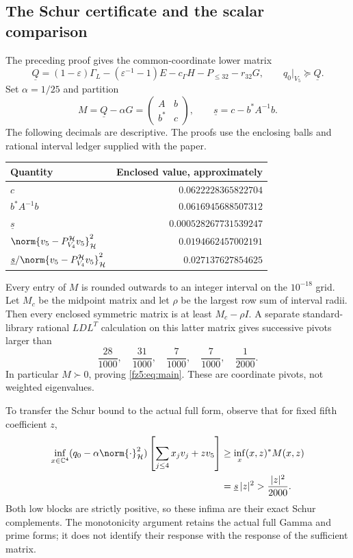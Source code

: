 \documentclass[11pt,a4paper]{article}
\numberwithin{equation}{section}
\theoremstyle{definition}\newtheorem{definition}[theorem]{Definition}
\theoremstyle{remark}\newtheorem{remark}[theorem]{Remark}
\newcommand{\Hh}{\mathcal H}\newcommand{\Hw}{\mathcal H}
\begin{document}
\subsection{The Schur certificate and the scalar comparison}
The preceding proof gives the common-coordinate lower matrix
\begin{equation}\label{fz5:eq:Qlower}
 \underline Q=(1-\varepsilon)\Gamma_L-(\varepsilon^{-1}-1)E
                -c_\Gamma H-P_{\le32}-r_{32}G,
 \qquad q_0|_{V_5}\succeq\underline Q.
\end{equation}
Set $\alpha=1/25$ and partition
\[
 M=\underline Q-\alpha G=\begin{pmatrix}A&b\\b^*&c\end{pmatrix},
 \qquad \underline s=c-b^*A^{-1}b.
\]
The following decimals are descriptive. The proofs use the enclosing
balls and rational interval ledger supplied with the paper.
\begin{center}
\begin{tabular}{lr}\toprule
Quantity & Enclosed value, approximately\\\midrule
$c$ & $0.0622228365822704$\\
$b^*A^{-1}b$ & $0.0616945688507312$\\
$\underline s$ & $0.000528267731539247$\\
$\norm{v_5-P_{V_4}^{\Hh}v_5}_\Hh^2$ & $0.0194662457002191$\\
$\underline s/\norm{v_5-P_{V_4}^{\Hh}v_5}_\Hh^2$ & $0.027137627854625$\\
\bottomrule\end{tabular}
\end{center}

Every entry of $M$ is rounded outwards to an integer interval on the
$10^{-18}$ grid. Let $M_c$ be the midpoint matrix and let $\rho$ be the
largest row sum of interval radii. Then every enclosed symmetric matrix
is at least $M_c-\rho I$. A separate standard-library rational
$LDL^T$ calculation on this latter matrix gives successive pivots larger
than
\[
 \frac{28}{1000},\quad\frac{31}{1000},\quad\frac7{1000},
 \quad\frac7{1000},\quad\frac1{2000}.
\]
In particular $M\succ0$, proving \eqref{fz5:eq:main}. These are coordinate
pivots, not weighted eigenvalues.

To transfer the Schur bound to the actual full form, observe that for
fixed fifth coefficient $z$,
\begin{align*}
 \inf_{x\in\mathbb C^4}(q_0-\alpha\norm{\cdot}_\Hh^2)
          \left[\sum_{j\le4}x_jv_j+zv_5\right]
 &\ge \inf_x (x,z)^*M(x,z)\\
 &=\underline s\,|z|^2>\frac{|z|^2}{2000}.
\end{align*}
Both low blocks are strictly positive, so these infima are their exact
Schur complements. The monotonicity argument retains the actual full
Gamma and prime forms; it does not identify their response with the
response of the sufficient matrix.
\end{document}
